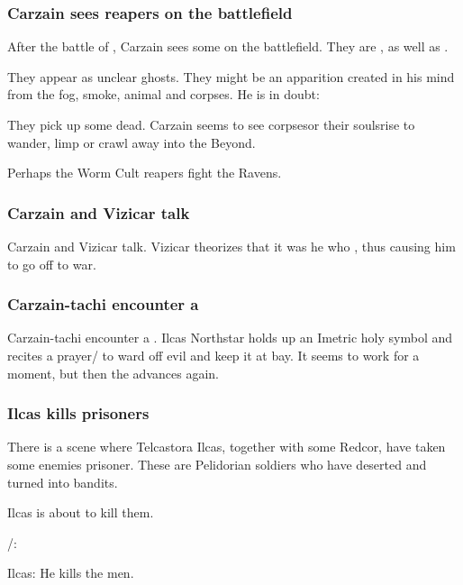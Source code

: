 \subsubsection{Carzain sees reapers on the battlefield}
After the battle of \Forclin, Carzain sees some  on the battlefield. They are , as well as . 

They appear as unclear ghosts. They might be an apparition created in his mind from the fog, smoke, animal and corpses. He is in doubt: 

They pick up some dead. Carzain seems to see corpses\dash or their souls\dash rise to wander, limp or crawl away into the Beyond. 

Perhaps the Worm Cult reapers fight the Ravens. 





\subsubsection{Carzain and Vizicar talk}
Carzain and Vizicar talk. 
Vizicar theorizes that it was he who , thus causing him to go off to war. 





\subsubsection{Carzain-tachi encounter a \bane}
Carzain-tachi encounter a \bane. 
Ilcas Northstar holds up an Imetric holy symbol and recites a prayer/ to ward off evil and keep it at bay. 
It seems to work for a moment, but then the \bane{} advances again. 





\subsubsection{Ilcas kills prisoners}
There is a scene where Telcastora Ilcas, together with some Redcor, have taken some enemies prisoner. 
These are Pelidorian soldiers who have deserted and turned into bandits. 

Ilcas is about to kill them. 

\begin{prose}
  \Racel/\Esmerel: 
  
  Ilcas: 
  He kills the men. 
\end{prose}

